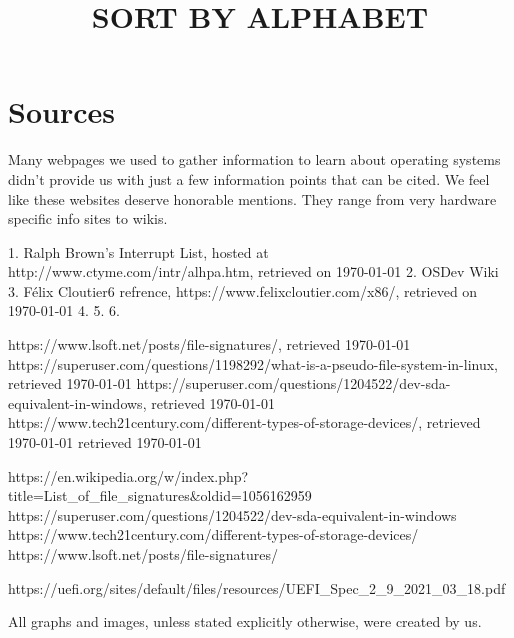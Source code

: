 \section{Sources}

Many webpages we used to gather information to learn about operating systems didn't provide us with
just a few information points that can be cited. We feel like these websites deserve honorable
mentions. They range from very hardware specific info sites to wikis.

\title{SORT BY ALPHABET}

1. Ralph Brown's Interrupt List, hosted at http://www.ctyme.com/intr/alhpa.htm, retrieved on \today
2. OSDev Wiki
3. Félix Cloutier6 refrence, https://www.felixcloutier.com/x86/, retrieved on \today
4. 
5.
6.

\begin{thebibliography}{10}
	https://www.lsoft.net/posts/file-signatures/,
	retrieved \today
{}
	https://superuser.com/questions/1198292/what-is-a-pseudo-file-system-in-linux,
	retrieved \today
{}
	https://superuser.com/questions/1204522/dev-sda-equivalent-in-windows,
	retrieved \today
{}
	https://www.tech21century.com/different-types-of-storage-devices/,
	retrieved \today
{}
        retrieved \today
\end{thebibliography}


https://en.wikipedia.org/w/index.php?title=List\_of\_file\_signatures&oldid=1056162959
https://superuser.com/questions/1204522/dev-sda-equivalent-in-windows
https://www.tech21century.com/different-types-of-storage-devices/
https://www.lsoft.net/posts/file-signatures/

https://uefi.org/sites/default/files/resources/UEFI\_Spec\_2\_9\_2021\_03\_18.pdf

%
All graphs and images, unless stated explicitly otherwise, were created by us. 
